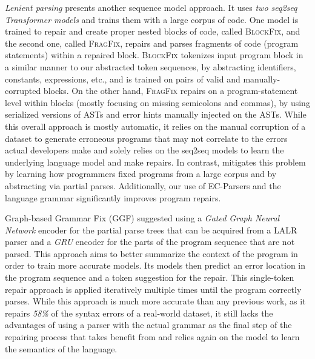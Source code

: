 \emph{Lenient parsing} \citep{Ahmed_2021} presents another sequence model
approach. It uses \emph{two seq2seq Transformer models} and trains them with a
large corpus of code. One model is trained to repair and create proper nested
blocks of code, called \textsc{BlockFix}, and the second one, called
\textsc{FragFix}, repairs and parses fragments of code (\eg program statements)
within a repaired block. \textsc{BlockFix} tokenizes input program block in a
similar manner to our abstracted token sequences, by abstracting identifiers,
constants, expressions, etc., and is trained on pairs of valid and
manually-corrupted blocks. On the other hand, \textsc{FragFix} repairs on a
program-statement level within blocks (mostly focusing on missing semicolons and
commas), by using serialized versions of ASTs and error hints manually injected
on the ASTs. While this overall approach is mostly automatic, it relies on the
manual corruption of a dataset to generate erroneous programs that may not
correlate to the errors actual developers make and solely relies on the seq2seq
models to learn the underlying language model and make repairs. In contrast,
\toolname mitigates this problem by learning how programmers fixed programs from
a large corpus and by abstracting via partial parses. Additionally, our use of
EC-Parsers and the language grammar significantly improves program repairs.

%
Graph-based Grammar Fix (\textsc{GGF}) \citep{Wu2020} suggested using a
\emph{Gated Graph Neural Network} encoder for the partial parse trees that can
be acquired from a LALR parser and a \emph{GRU} encoder for the parts of the
program sequence that are not parsed. This approach aims to better summarize the
context of the program in order to train more accurate models. Its models then
predict an error location in the program sequence and a token suggestion for the
repair. This single-token repair approach is applied iteratively multiple times
until the program correctly parses. While this approach is much more accurate
than any previous work, as it repairs \emph{58\%} of the syntax errors of a
real-world dataset, it still lacks the advantages of using a parser with the
actual grammar as the final step of the repairing process that \toolname takes
benefit from and relies again on the model to learn the semantics of the
language.


